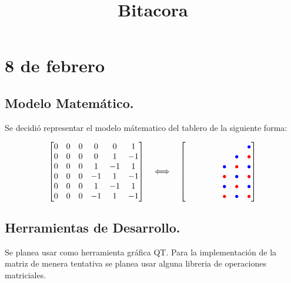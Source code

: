 \documentclass[12pt,a4paper]{article}
\title{Bitacora}
\date{}
\begin{document}
 
\maketitle


\section{8 de febrero}

\subsection{Modelo Matemático.}

Se decidió representar el modelo mátematico del tablero de la siguiente forma:



\[
\begin{bmatrix}
0 & 0 & 0 & 0 &  0 &  1 \\
0 & 0 & 0 & 0 &  1 & -1 \\
0 & 0 & 0 &  1 & -1 &  1 \\
0 & 0 & 0 & -1 &  1 & -1 \\
0 & 0 & 0 &  1 & -1 &  1 \\
0 & 0 & 0 & -1 &  1 & -1
\end{bmatrix}
\quad \Longleftrightarrow \quad
\begin{bmatrix}
\phantom{\bullet} & \phantom{\bullet} & \phantom{\bullet} & \phantom{\bullet} & \phantom{\bullet} & \textcolor{blue}{\bullet} \\
\phantom{\bullet} & \phantom{\bullet} & \phantom{\bullet} & \phantom{\bullet} & \textcolor{blue}{\bullet} & \textcolor{red}{\bullet} \\
\phantom{\bullet} & \phantom{\bullet} & \phantom{\bullet} & \textcolor{blue}{\bullet} & \textcolor{red}{\bullet} & \textcolor{blue}{\bullet} \\
\phantom{\bullet} & \phantom{\bullet} & \phantom{\bullet} & \textcolor{red}{\bullet} & \textcolor{blue}{\bullet} & \textcolor{red}{\bullet} \\
\phantom{\bullet} & \phantom{\bullet} & \phantom{\bullet} & \textcolor{blue}{\bullet} & \textcolor{red}{\bullet} & \textcolor{blue}{\bullet} \\
\phantom{\bullet} & \phantom{\bullet} & \phantom{\bullet} & \textcolor{red}{\bullet} & \textcolor{blue}{\bullet} & \textcolor{red}{\bullet}
\end{bmatrix}
\]

\subsection{Herramientas de Desarrollo.}

Se planea usar como herramienta gráfica QT.
Para la implementación de la matriz de menera tentativa se planea usar alguna libreria de operaciones matriciales.
\end{document}
